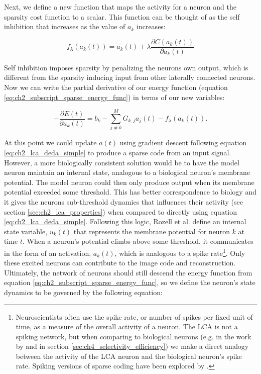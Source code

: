 Next, we define a new function that maps the activity for a neuron and the sparsity cost function to a scalar. This function can be thought of as the self inhibition that increases as the value of $a_{k}$ increases:

\begin{equation}\label{eq:ch2_hopfield_t_func}
  f_{\lambda}(a_{k}(t)) = a_{k}(t) + \lambda \frac{\partial C(a_{k}(t))}{\partial a_{k}(t)}
\end{equation}

Self inhibition imposes sparsity by penalizing the neurons own output, which is different from the sparsity inducing input from other laterally connected neurons. Now we can write the partial derivative of our energy function (equation \eqref{eq:ch2_subscript_sparse_energy_func}) in terms of our new variables:

\begin{equation}\label{eq:ch2_lca_deda_simple}
    - \frac{\partial E(t)}{\partial a_{k}(t)} =
    b_{k} -
    \sum\limits_{j \neq k}^{M} G_{k,j} a_{j}(t) -
    f_{\lambda}(a_{k}(t)).
\end{equation}

At this point we could update $a(t)$ using gradient descent following equation \eqref{eq:ch2_lca_deda_simple} to produce a sparse code from an input signal. However, a more biologically consistent solution would be to have the model neuron maintain an internal state, analogous to a biological neuron's membrane potential. The model neuron could then only produce output when its membrane potential exceeded some threshold. This has better correspondence to biology and it gives the neurons sub-threshold dynamics that influences their activity (see section \ref{sec:ch2_lca_properties}) when compared to directly using equation \eqref{eq:ch2_lca_deda_simple}. Following this logic, Rozell et al. \citeyearpar{rozell2008sparse} define an internal state variable, $u_{k}(t)$ that represents the membrane potential for neuron $k$ at time $t$. When a neuron's potential climbs above some threshold, it communicates in the form of an activation, $a_{k}(t)$, which is analogous to a spike rate\footnote{Neuroscientists often use the spike rate, or number of spikes per fixed unit of time, as a measure of the overall activity of a neuron. The LCA is not a spiking network, but when comparing to biological neurons (e.g. in the work by \cite{zhu2013visual} and in section \ref{sec:ch4_selectivity_efficiency}) we make a direct analogy between the activity of the LCA neuron and the biological neuron's spike rate. Spiking versions of sparse coding have been explored by \parencite{zylberberg2011sparse, olshausen2003learning}.}. Only these excited neurons can contribute to the image code and reconstruction. Ultimately, the network of neurons should still descend the energy function from equation \eqref{eq:ch2_subscript_sparse_energy_func}, so we define the neuron's state dynamics to be governed by the following equation:

